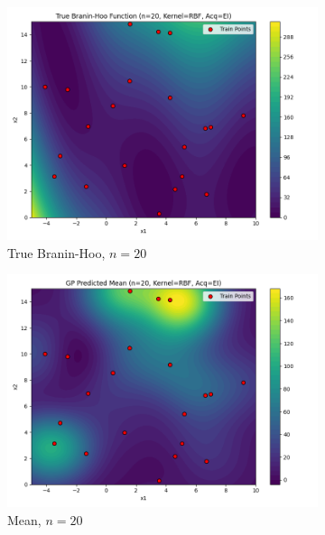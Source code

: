 \documentclass[a4paper,12pt]{article}
\begin{document}
\begin{figure}[H]
\begin{subfigure}{0.3\textwidth}
  \includegraphics[width=\linewidth]{Task-02/images/true_function_rbf_n20_EI.png}
  \caption{True Branin-Hoo, $n=20$}
\end{subfigure}
\begin{subfigure}{0.3\textwidth}
    \includegraphics[width=\linewidth]{Task-02/images/gp_mean_rbf_n20_EI.png}
    \caption{Mean, $n=20$}
\end{subfigure}
\begin{subfigure}{0.3\textwidth}

\end{subfigure}
\end{figure}
\end{document}
